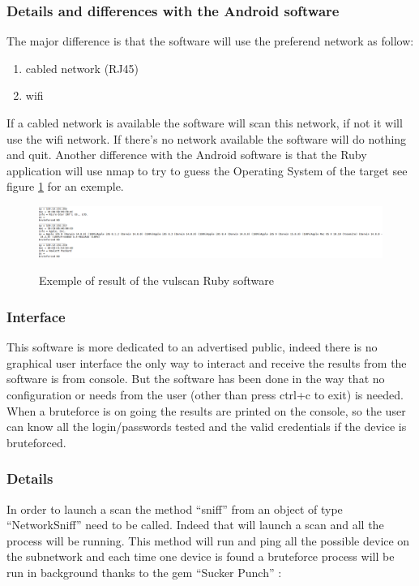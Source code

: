 \documentclass{report}
\begin{document}
\subsubsection{Details and differences with the Android software}
The major difference is that the software will use the preferend network as follow:
\begin{enumerate}
 \item cabled network (RJ45)
 \item wifi
\end{enumerate}
If a cabled network is available the software will scan this network, if not it will use the wifi network. If there's no network available the software will do nothing and quit.\newline
Another difference with the Android software is that the Ruby application will use nmap to try to guess the Operating System of the target see figure \ref{fig:result-os} for an exemple.
\begin{figure}
 \caption{Exemple of result of the vulscan Ruby software}
 \centering
 \includegraphics[width=1.2\textwidth]{./img/result-os}
 \label{fig:result-os}
\end{figure}

\subsubsection{Interface}
This software is more dedicated to an advertised public, indeed there is no graphical user interface the only way to interact and receive the results from the software is from console. But the software has been done in the way that no configuration or needs from the user (other than press ctrl+c to exit) is needed. When a bruteforce is on going the results are printed on the console, so the user can know all the login/passwords tested and the valid credentials if the device is bruteforced.

\subsubsection{Details}
In order to launch a scan the method ``sniff'' from an object of type ``NetworkSniff'' need to be called. Indeed that will launch a scan and all the process will be running. This method will run and ping all the possible device on the subnetwork and each time one device is found a bruteforce process will be run in background thanks to the gem ``Sucker Punch'' \autocite{suckerpunch}:
\end{document}
